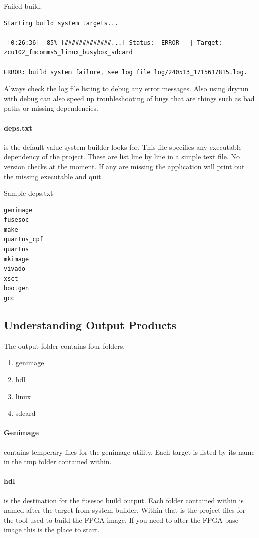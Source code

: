 \par
Failed build:
\begin{lstlisting}[language={}]
Starting build system targets...

 [0:26:36]  85% [#############...] Status:  ERROR   | Target: zcu102_fmcomms5_linux_busybox_sdcard

ERROR: build system failure, see log file log/240513_1715617815.log.
\end{lstlisting}
Always check the log file listing to debug any error messages. Also using \textendash dryrun with \textendash debug can also speed up troubleshooting
of bugs that are things such as bad paths or missing dependencies.

\paragraph{deps.txt} is the default value system builder looks for. This file specifies any executable dependency of the project.
These are list line by line in a simple text file. No version checks at the moment. If any are missing the application will print out
the missing executable and quit.

Sample deps.txt
\begin{lstlisting}[language={}]
genimage
fusesoc
make
quartus_cpf
quartus
mkimage
vivado
xsct
bootgen
gcc
\end{lstlisting}

\subsection{Understanding Output Products}

\par
The output folder contains four folders.
\begin{enumerate}
\item genimage
\item hdl
\item linux
\item sdcard
\end{enumerate}

\paragraph{Genimage} contains temperary files for the genimage utility. Each target is listed by its name in the tmp folder contained within.

\paragraph{hdl} is the destination for the fusesoc build output. Each folder contained within is named after the target from system builder.
Within that is the project files for the tool used to build the FPGA image. If you need to alter the FPGA base image this is the place to start.

